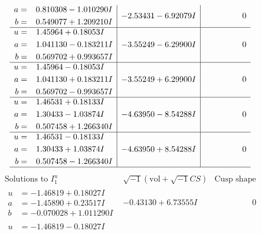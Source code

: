 \documentclass[1p]{elsarticle_modified}
\theoremstyle{definition}
\newcommand{\I}{\sqrt{-1}}
\begin{document}
$$\begin{array}{c|c|c}
\begin{aligned}
a &= \phantom{-}0.810308 - 1.010290 I \\
b &= \phantom{-}0.549077 + 1.209210 I\end{aligned}
 & -2.53431 - 6.92079 I & \phantom{-0.000000 } 0 \\ \hline\begin{aligned}
u &= \phantom{-}1.45964 + 0.18053 I \\
a &= \phantom{-}1.041130 - 0.183211 I \\
b &= \phantom{-}0.569702 + 0.993657 I\end{aligned}
 & -3.55249 - 6.29900 I & \phantom{-0.000000 } 0 \\ \hline\begin{aligned}
u &= \phantom{-}1.45964 - 0.18053 I \\
a &= \phantom{-}1.041130 + 0.183211 I \\
b &= \phantom{-}0.569702 - 0.993657 I\end{aligned}
 & -3.55249 + 6.29900 I & \phantom{-0.000000 } 0 \\ \hline\begin{aligned}
u &= \phantom{-}1.46531 + 0.18133 I \\
a &= \phantom{-}1.30433 - 1.03874 I \\
b &= \phantom{-}0.507458 + 1.266340 I\end{aligned}
 & -4.63950 - 8.54288 I & \phantom{-0.000000 } 0 \\ \hline\begin{aligned}
u &= \phantom{-}1.46531 - 0.18133 I \\
a &= \phantom{-}1.30433 + 1.03874 I \\
b &= \phantom{-}0.507458 - 1.266340 I\end{aligned}
 & -4.63950 + 8.54288 I & \phantom{-0.000000 } 0\\
 \hline 
 \end{array}$$\newpage$$\begin{array}{c|c|c}  
\text{Solutions to }I^u_{1}& \I (\text{vol} + \sqrt{-1}CS) & \text{Cusp shape}\\
 \hline 
\begin{aligned}
u &= -1.46819 + 0.18027 I \\
a &= -1.45890 + 0.23517 I \\
b &= -0.070028 + 1.011290 I\end{aligned}
 & -0.43130 + 6.73555 I & \phantom{-0.000000 } 0 \\ \hline\begin{aligned}
u &= -1.46819 - 0.18027 I \\

\end{aligned}
\end{array}$$
\end{document}
